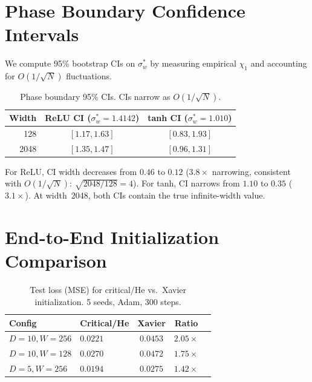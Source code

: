 \documentclass[10pt]{article}
\begin{document}
\section{Phase Boundary Confidence Intervals}
\label{app:phase-boundary}

We compute 95\% bootstrap CIs on $\sigma_w^*$ by measuring empirical $\chi_1$ and accounting for $O(1/\sqrt{N})$ fluctuations.

\begin{table}[h]
\centering
\caption{Phase boundary 95\% CIs. CIs narrow as $O(1/\sqrt{N})$.}
\label{tab:phase-boundary}
\small
\begin{tabular}{@{}rcc@{}}
\toprule
\textbf{Width} & \textbf{ReLU CI} ($\sigma_w^* = 1.4142$) & \textbf{tanh CI} ($\sigma_w^* = 1.010$) \\
\midrule
128  & $[1.17, 1.63]$ & $[0.83, 1.93]$ \\
2048 & $[1.35, 1.47]$ & $[0.96, 1.31]$ \\
\bottomrule
\end{tabular}
\end{table}

For ReLU, CI width decreases from $0.46$ to $0.12$ ($3.8\times$ narrowing, consistent with $O(1/\sqrt{N})$: $\sqrt{2048/128} = 4$).
For tanh, CI narrows from $1.10$ to $0.35$ ($3.1\times$).
At width~2048, both CIs contain the true infinite-width value.

\section{End-to-End Initialization Comparison}
\label{app:e2e-init}

\begin{table}[h]
\centering
\caption{Test loss (MSE) for critical/He vs.\ Xavier initialization. 5 seeds, Adam, 300 steps.}
\label{tab:e2e-init}
\small
\begin{tabular}{@{}llccc@{}}
\toprule
\textbf{Config} & \textbf{Critical/He} & \textbf{Xavier} & \textbf{Ratio} \\
\midrule
$D\!=\!10, W\!=\!256$  & $\mathbf{0.0221}$ & $0.0453$ & $2.05\times$ \\
$D\!=\!10, W\!=\!128$  & $\mathbf{0.0270}$ & $0.0472$ & $1.75\times$ \\
$D\!=\!5, W\!=\!256$   & $\mathbf{0.0194}$ & $0.0275$ & $1.42\times$ \\
\bottomrule
\end{tabular}
\end{table}
\end{document}
